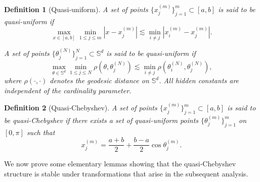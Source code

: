\documentclass{article}
\numberwithin{equation}{section}
\newtheorem{definition}{Definition}
\def\SS{\mathbb{S}}
\def\mal{\max\limits}
\begin{document}
\begin{definition}[Quasi-uniform]\label{def_quasi_uniform}
    A set of points $\{x_j^{(m)}\}_{j=1}^m\subset [a,b]$ is said to be quasi-uniform if
    \begin{equation}\label{eqn:quasiuniform-1}
        \mal_{x\in[a,b]}\min\limits_{1\leq j\leq m}|x-x_j^{(m)}|\lesssim\min\limits_{i\neq j}|x_i^{(m)}-x_j^{(m)}|.
    \end{equation}

    A set of points $\{\theta_j^{(N)}\}_{j=1}^N\subset \SS^d$ is said to be quasi-uniform if
    \begin{equation}\label{eqn:quasiuniform-2}
        \mal_{\theta\in \SS^d}\min\limits_{1\leq j\leq N}\rho(\theta,\theta_j^{(N)})\lesssim\min\limits_{i\neq j}\rho(\theta_i^{(N)},\theta_j^{(N)}),
    \end{equation}
    where $\rho(\cdot,\cdot)$ denotes the geodesic distance on $\SS^d$.
    All hidden constants are independent of the cardinality parameter.
\end{definition}
\begin{definition}[Quasi-Chebyshev]\label{def_quasi-chebyshev}
    A set of points $\{x_j^{(m)}\}_{j=1}^m\subset [a,b]$ is said to be quasi-Chebyshev if there exists a set of quasi-uniform points $\{\theta_j^{(m)}\}_{j=1}^m$ on $[0,\pi]$ such that $$x_j^{(m)} = \frac{a+b}{2}+\frac{b-a}{2}\cos\theta_j^{(m)}.$$
\end{definition}

We now prove some elementary lemmas showing that the quasi-Chebyshev structure is stable under transformations that arise in the subsequent analysis.
\end{document}
